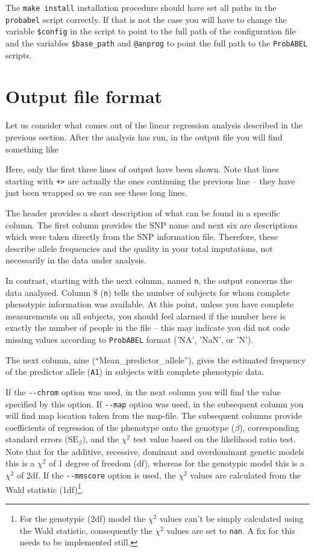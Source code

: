 \documentclass[12pt,a4paper]{article}
\newcommand{\PA}{\texttt{ProbABEL}}
\begin{document}
The \texttt{make install} installation procedure should have set all
paths in the \texttt{probabel} script correctly. If that is not the
case you will have to change the variable \texttt{\$config} in the
script to point to the full path of the configuration file and the
variables \texttt{\$base\_path} and \texttt{@anprog} to point the full
path to the \PA{} scripts.


\section{Output file format}
Let us consider what comes out of the linear regression analysis
described in the previous section. After the analysis has run, in
the output file you will find something like
\begin{small}

\end{small}

Here, only the first three lines of output have been shown. Note that lines
starting with \texttt{+>} are actually the ones continuing the
previous line -- they have just been wrapped so we can see
these long lines.

The header provides a short description of what can be found in a
specific column. The first column provides the SNP name and
next six are descriptions which were taken directly from the
SNP information file. Therefore, these describe allele frequencies and
the quality in your total imputations, not necessarily in the data under
analysis.

In contrast, starting with the next column, named \texttt{n},
the output concerns the data analysed. Column 8 (\texttt{n}) tells the
number of subjects for whom complete phenotypic information was
available. At this point, unless you have complete measurements on all
subjects, you should feel alarmed if the number here is exactly the
number of people in the file -- this may indicate you did not code
missing values according to \PA{} format ('NA', 'NaN', or 'N').

The next column, nine (``Mean\_predictor\_allele''), gives the estimated
frequency of the predictor allele (\texttt{A1}) in subjects with complete
phenotypic data.

If the \lstinline{--chrom} option was used, in the next column you will
find the value specified by this option. If \lstinline{--map} option was
used, in the subsequent column you will find map location taken from
the map-file. The subsequent columns provide coefficients of
regression of the phenotype onto the genotype ($\beta$), corresponding
standard errors ($\text{SE}_\beta$), and the $\chi^2$ test value based
on the likelihood ratio test. Note that for the additive, recessive,
dominant and overdominant genetic models this is a $\chi^2$ of 1
degree of freedom (df), whereas for the genotypic model this is a
$\chi^2$ of 2df. If the \lstinline{--mmscore} option is used, the
$\chi^2$ values are calculated from the Wald statistic
(1df)\footnote{For the genotypic (2df) model the $\chi^2$ values can't
  be simply calculated using the Wald statistic, consequently the
  $\chi^2$ values are set to \texttt{nan}. A fix for this needs to be
  implemented still.}.
\end{document}
